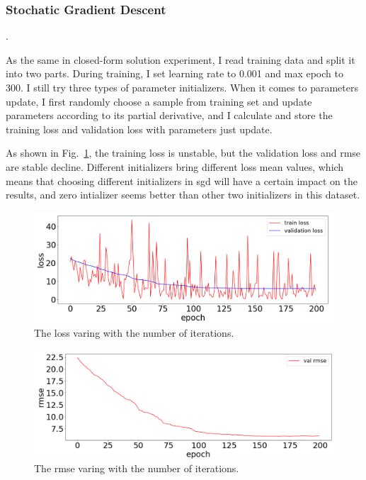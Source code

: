 \documentclass[journal, a4paper]{IEEEtran}
\begin{document}
\subsubsection{Stochatic Gradient Descent}
.

As the same in closed-form solution experiment, I read training data and split it into two parts. During training, I set learning rate to 0.001 and max epoch to 300. I still try three types of parameter initializers. When it comes to parameters update, I first randomly choose a sample from training set and update parameters according to its partial derivative, and I calculate and store the training loss and validation loss with parameters just update.

As shown in Fig.~\ref{fig:sgd0}, the training loss is unstable, but the validation loss and rmse are stable decline. Different initializers bring different loss mean values, which means that choosing different initializers in sgd will have a certain impact on the results, and zero intializer seems better than other two initializers in this dataset.

	\begin{figure}[!hbt]
		\begin{center}
		\includegraphics[width=\columnwidth]{sgd0}
		\caption{The loss varing with the number of iterations.}
		\label{fig:sgd0}
		\end{center}
	\end{figure}
	
	\begin{figure}[!hbt]
		\begin{center}
		\includegraphics[width=\columnwidth]{sgd1}
		\caption{The rmse varing with the number of iterations.}
		\label{fig:sgd1}
		\end{center}
	\end{figure}
\end{document}
